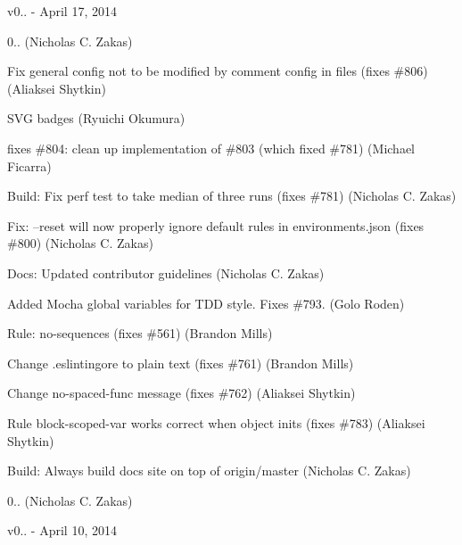 v0.. -\/ April 17, 2014


\begin{DoxyItemize}
\item 0.. (Nicholas C. Zakas)
\item Fix general config not to be modified by comment config in files (fixes \#806) (Aliaksei Shytkin)
\item S\+VG badges (Ryuichi Okumura)
\item fixes \#804\+: clean up implementation of \#803 (which fixed \#781) (Michael Ficarra)
\item Build\+: Fix perf test to take median of three runs (fixes \#781) (Nicholas C. Zakas)
\item Fix\+: --reset will now properly ignore default rules in environments.\+json (fixes \#800) (Nicholas C. Zakas)
\item Docs\+: Updated contributor guidelines (Nicholas C. Zakas)
\item Added Mocha global variables for T\+DD style. Fixes \#793. (Golo Roden)
\item Rule\+: no-\/sequences (fixes \#561) (Brandon Mills)
\item Change .eslintingore to plain text (fixes \#761) (Brandon Mills)
\item Change \textquotesingle{}no-\/spaced-\/func\textquotesingle{} message (fixes \#762) (Aliaksei Shytkin)
\item Rule \textquotesingle{}block-\/scoped-\/var\textquotesingle{} works correct when object inits (fixes \#783) (Aliaksei Shytkin)
\item Build\+: Always build docs site on top of origin/master (Nicholas C. Zakas)
\item 0.. (Nicholas C. Zakas)
\end{DoxyItemize}

v0.. -\/ April 10, 2014


